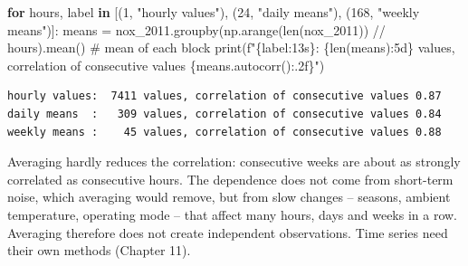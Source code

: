 \documentclass[
  letterpaper,
  DIV=11,
  numbers=noendperiod]{scrreprt}
\newenvironment{Shaded}{\begin{snugshade}}{\end{snugshade}}
\newcommand{\BuiltInTok}[1]{\textcolor[rgb]{0.00,0.23,0.31}{#1}}
\newcommand{\CommentTok}[1]{\textcolor[rgb]{0.37,0.37,0.37}{#1}}
\newcommand{\ControlFlowTok}[1]{\textcolor[rgb]{0.00,0.23,0.31}{\textbf{#1}}}
\newcommand{\DecValTok}[1]{\textcolor[rgb]{0.68,0.00,0.00}{#1}}
\newcommand{\KeywordTok}[1]{\textcolor[rgb]{0.00,0.23,0.31}{\textbf{#1}}}
\newcommand{\NormalTok}[1]{\textcolor[rgb]{0.00,0.23,0.31}{#1}}
\newcommand{\OperatorTok}[1]{\textcolor[rgb]{0.37,0.37,0.37}{#1}}
\newcommand{\SpecialCharTok}[1]{\textcolor[rgb]{0.37,0.37,0.37}{#1}}
\newcommand{\SpecialStringTok}[1]{\textcolor[rgb]{0.13,0.47,0.30}{#1}}
\newcommand{\StringTok}[1]{\textcolor[rgb]{0.13,0.47,0.30}{#1}}
\begin{document}
\begin{tcolorbox}[enhanced jigsaw, left=2mm, title=\textcolor{quarto-callout-caution-color}{\faFire}\hspace{0.5em}{Solution to Exercise 3}, opacityback=0, breakable, rightrule=.15mm, arc=.35mm, toptitle=1mm, colbacktitle=quarto-callout-caution-color!10!white, opacitybacktitle=0.6, coltitle=black, colframe=quarto-callout-caution-color-frame, bottomrule=.15mm, leftrule=.75mm, bottomtitle=1mm, titlerule=0mm, toprule=.15mm, colback=white]

\begin{Shaded}
\begin{Highlighting}[]
\ControlFlowTok{for}\NormalTok{ hours, label }\KeywordTok{in}\NormalTok{ [(}\DecValTok{1}\NormalTok{, }\StringTok{"hourly values"}\NormalTok{), (}\DecValTok{24}\NormalTok{, }\StringTok{"daily means"}\NormalTok{), (}\DecValTok{168}\NormalTok{, }\StringTok{"weekly means"}\NormalTok{)]:}
\NormalTok{    means }\OperatorTok{=}\NormalTok{ nox\_2011.groupby(np.arange(}\BuiltInTok{len}\NormalTok{(nox\_2011)) }\OperatorTok{//}\NormalTok{ hours).mean()  }\CommentTok{\# mean of each block}
    \BuiltInTok{print}\NormalTok{(}\SpecialStringTok{f"}\SpecialCharTok{\{}\NormalTok{label}\SpecialCharTok{:13s\}}\SpecialStringTok{: }\SpecialCharTok{\{}\BuiltInTok{len}\NormalTok{(means)}\SpecialCharTok{:5d\}}\SpecialStringTok{ values, correlation of consecutive values }\SpecialCharTok{\{}\NormalTok{means}\SpecialCharTok{.}\NormalTok{autocorr()}\SpecialCharTok{:.2f\}}\SpecialStringTok{"}\NormalTok{)}
\end{Highlighting}
\end{Shaded}

\begin{verbatim}
hourly values:  7411 values, correlation of consecutive values 0.87
daily means  :   309 values, correlation of consecutive values 0.84
weekly means :    45 values, correlation of consecutive values 0.88
\end{verbatim}

Averaging hardly reduces the correlation: consecutive weeks are about as
strongly correlated as consecutive hours. The dependence does not come
from short-term noise, which averaging would remove, but from slow
changes -- seasons, ambient temperature, operating mode -- that affect
many hours, days and weeks in a row. Averaging therefore does not create
independent observations. Time series need their own methods (Chapter
11).

\end{tcolorbox}
\end{document}
